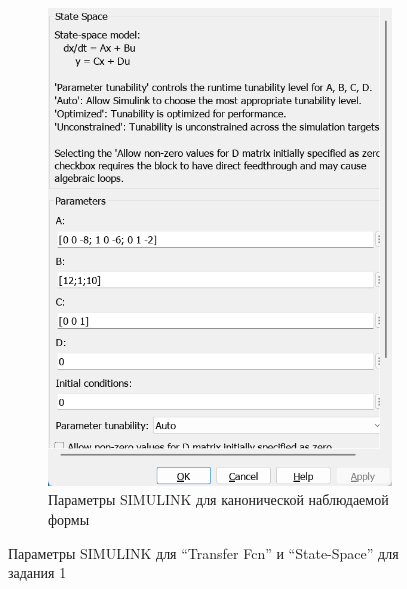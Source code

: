 \documentclass[a4paper, 12pt]{article}
\begin{document}
\begin{figure}[H]
\begin{subfigure}{0.3\textwidth}
            \includegraphics[width=\linewidth]{canonical_observable_form_1_window.png}
            \caption{Параметры SIMULINK для канонической наблюдаемой формы}
            \label{fig:cof1w}
        \end{subfigure}
        \caption{Параметры SIMULINK для ``Transfer Fcn'' и ``State-Space'' для задания 1}
        \label{fig:windows1}
    \end{figure}
\end{document}

